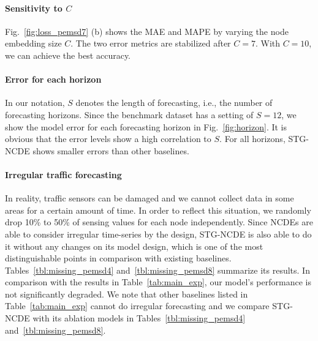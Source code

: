 \documentclass[letterpaper]{article} \usepackage{aaai22}  \usepackage{times}  \usepackage{helvet}  \usepackage{courier}  \usepackage[hyphens]{url}  \usepackage{graphicx} \urlstyle{rm} \def\UrlFont{\rm}  \usepackage{natbib}  \usepackage{caption} \DeclareCaptionStyle{ruled}{labelfont=normalfont,labelsep=colon,strut=off} \frenchspacing  \setlength{\pdfpagewidth}{8.5in}  \setlength{\pdfpageheight}{11in}  \usepackage{stfloats}
\begin{document}
\paragraph{Sensitivity to $C$} Fig.~\ref{fig:loss_pemsd7} (b) shows the MAE and MAPE by varying the node embedding size $C$. The two error metrics are stabilized after $C=7$. With $C=10$, we can achieve the best accuracy.

\paragraph{Error for each horizon} In our notation, $S$ denotes the length of forecasting, i.e., the number of forecasting horizons. Since the benchmark dataset has a setting of $S=12$, we show the model error for each forecasting horizon in Fig.~\ref{fig:horizon}. It is obvious that the error levels show a high correlation to $S$. For all horizons, STG-NCDE shows smaller errors than other baselines.

\paragraph{Irregular traffic forecasting} In reality, traffic sensors can be damaged and we cannot collect data in some areas for a certain amount of time. In order to reflect this situation, we randomly drop 10\% to 50\% of sensing values for each node independently. Since NCDEs are able to consider irregular time-series by the design, STG-NCDE is also able to do it without any changes on its model design, which is one of the  most distinguishable points in comparison with existing baselines. Tables~\ref{tbl:missing_pemsd4} and~\ref{tbl:missing_pemsd8} summarize its results. In comparison with the results in Table~\ref{tab:main_exp}, our model's performance is not significantly degraded. We note that other baselines listed in Table~\ref{tab:main_exp} cannot do irregular forecasting and we compare STG-NCDE with its ablation models in Tables~\ref{tbl:missing_pemsd4} and~\ref{tbl:missing_pemsd8}.
\end{document}
